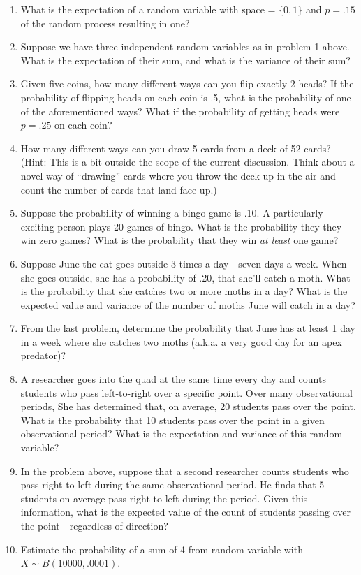 \documentclass[
]{book}
\theoremstyle{definition}
\theoremstyle{definition}
\theoremstyle{definition}
\theoremstyle{definition}
\theoremstyle{remark}
\begin{document}
\begin{enumerate}
\def\labelenumi{\arabic{enumi}.}
\item
  What is the expectation of a random variable with space = \(\{0,1\}\) and \(p = .15\) of the random process resulting in one?
\item
  Suppose we have three independent random variables as in problem 1 above. What is the expectation of their sum, and what is the variance of their sum?
\item
  Given five coins, how many different ways can you flip exactly 2 heads? If the probability of flipping heads on each coin is .5, what is the probability of one of the aforementioned ways? What if the probability of getting heads were \(p = .25\) on each coin?
\item
  How many different ways can you draw 5 cards from a deck of 52 cards? (Hint: This is a bit outside the scope of the current discussion. Think about a novel way of ``drawing'' cards where you throw the deck up in the air and count the number of cards that land face up.)
\item
  Suppose the probability of winning a bingo game is .10. A particularly exciting person plays 20 games of bingo. What is the probability they they win zero games? What is the probability that they win \emph{at least} one game?
\item
  Suppose June the cat goes outside 3 times a day - seven days a week. When she goes outside, she has a probability of .20, that she'll catch a moth. What is the probability that she catches two or more moths in a day? What is the expected value and variance of the number of moths June will catch in a day?
\item
  From the last problem, determine the probability that June has at least 1 day in a week where she catches two moths (a.k.a. a very good day for an apex predator)?
\item
  A researcher goes into the quad at the same time every day and counts students who pass left-to-right over a specific point. Over many observational periods, She has determined that, on average, 20 students pass over the point. What is the probability that 10 students pass over the point in a given observational period? What is the expectation and variance of this random variable?
\item
  In the problem above, suppose that a second researcher counts students who pass right-to-left during the same observational period. He finds that 5 students on average pass right to left during the period. Given this information, what is the expected value of the count of students passing over the point - regardless of direction?
\item
  Estimate the probability of a sum of 4 from random variable with \(X \sim B(10000,.0001)\).
\end{enumerate}
\end{document}
